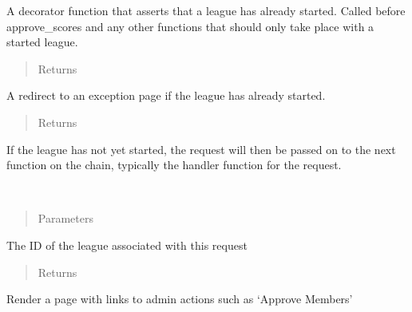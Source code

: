 \documentclass[letterpaper,10pt,english]{sphinxmanual}
\begin{document}
\begin{fulllineitems}
\label{\detokenize{tiger_leagues/readme:tiger_leagues.admin.league_has_started}}
A decorator function that asserts that a league has already started. 
Called before approve\_scores and any other functions that should only take 
place with a started league.
\begin{quote}\begin{description}
\item[{Returns}] \leavevmode
{}

\end{description}\end{quote}

A redirect to an exception page if the league has already started.
\begin{quote}\begin{description}
\item[{Returns}] \leavevmode
{}

\end{description}\end{quote}

If the league has not yet started, the request will 
then be passed on to the next function on the chain, typically the handler 
function for the request.

\end{fulllineitems}


\begin{fulllineitems}
\label{\detokenize{tiger_leagues/readme:tiger_leagues.admin.league_homepage}}~\begin{quote}\begin{description}
\item[{Parameters}] \leavevmode
{} \textendash{} 

\end{description}\end{quote}

The ID of the league associated with this request
\begin{quote}\begin{description}
\item[{Returns}] \leavevmode
{}

\end{description}\end{quote}

Render a page with links to admin actions such as ‘Approve Members’

\end{fulllineitems}
\end{document}
